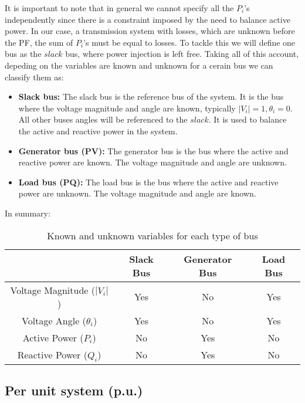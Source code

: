\documentclass[a4paper,11pt, titlepage, twoside]{article}
\begin{document}
It is important to note that in general we cannot specify all the $P_i$'s independently since there is a constraint imposed by the need to balance active power. In our case, a transmission system with losses, which are unknown before the PF,
the sum of $P_i$'s must be equal to losses. To tackle this we will define one bus as the $slack$ bus, where power injection is left free. Taking all of this account, depeding on the variables are known and unknown for a cerain bus we can classify them as:
\begin{itemize}
    \item \textbf{Slack bus:} The slack bus is the reference bus of the system. It is the bus where the voltage magnitude and angle are known, typically $|V_i|= 1, \theta_i= 0 $.
    All other buses angles will be referenced to the $slack$. It is used to balance the active and reactive power in the system.
    \item \textbf{Generator bus (PV):} The generator bus is the bus where the active and reactive power are known. The voltage magnitude and angle are unknown.
    \item \textbf{Load bus (PQ):} The load bus is the bus where the active and reactive power are unknown. The voltage magnitude and angle are known.
\end{itemize}
In summary:
\begin{table}[h]
    \centering
    \begin{tabular}{|c|c|c|c|}
        \hline
        & Slack Bus & Generator Bus & Load Bus \\
        \hline
        Voltage Magnitude ($|V_i|$) & Yes & No & Yes \\
        \hline
        Voltage Angle ($\theta_i$) & Yes & No & Yes \\
        \hline
        Active Power ($P_i$) & No & Yes & No \\
        \hline
        Reactive Power ($Q_i$) & No & Yes & No \\
        \hline
    \end{tabular}
    \caption{Known and unknown variables for each type of bus}
    \label{tab:bus_variables}
\end{table}





\subsection{Per unit system (p.u.)}
\end{document}
